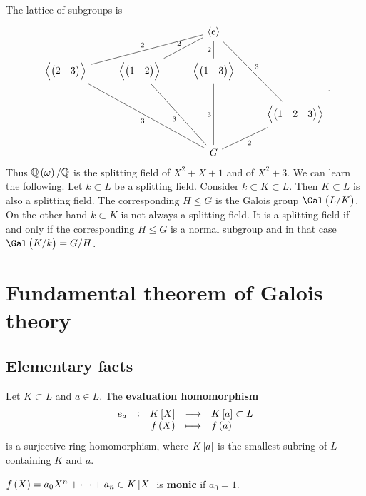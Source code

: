 The lattice of subgroups is
$$
\begin{tikzcd}
& & \abr{e} & \\
\abr{\onebytwo{2}{3}} \arrow[dash]{urr}{2} & \abr{\onebytwo{1}{2}} \arrow[dash]{ur}{2} & \abr{\onebytwo{1}{3}} \arrow[dash]{u}{2} & \\
& & & \abr{\onebythree{1}{2}{3}} \arrow[dash, swap]{uul}{3} \\
& & G \arrow[dash]{uull}{3} \arrow[dash]{uul}{3} \arrow[dash]{uu}{3} \arrow[dash, swap]{ur}{2} &
\end{tikzcd}.
$$
Thus $ \QQ\br{\omega} / \QQ $ is the splitting field of $ X^2 + X + 1 $ and of $ X^2 + 3 $. We can learn the following. Let $ k \subset L $ be a splitting field. Consider $ k \subset K \subset L $. Then $ K \subset L $ is also a splitting field. The corresponding $ H \le G $ is the Galois group $ \Gal\br{L / K} $. On the other hand $ k \subset K $ is not always a splitting field. It is a splitting field if and only if the corresponding $ H \le G $ is a normal subgroup and in that case $ \Gal\br{K / k} = G / H $.

\pagebreak

\section{Fundamental theorem of Galois theory}

\subsection{Elementary facts}


Let $ K \subset L $ and $ a \in L $. The \textbf{evaluation homomorphism}
$$ \function[e_a]{K\sbr{X}}{K\sbr{a} \subset L}{f\br{X}}{f\br{a}} $$
is a surjective ring homomorphism, where $ K\sbr{a} $ is the smallest subring of $ L $ containing $ K $ and $ a $.

\begin{definition}
$ f\br{X} = a_0X^n + \dots + a_n \in K\sbr{X} $ is \textbf{monic} if $ a_0 = 1 $.
\end{definition}

